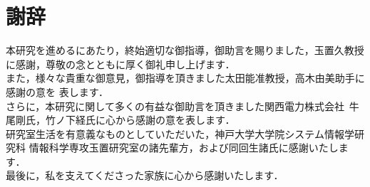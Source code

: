 \chapter*{謝辞}

本研究を進めるにあたり，終始適切な御指導，御助言を賜りました，玉置久教授に感謝，尊敬の念とともに厚く御礼申し上げます．
\\
\indent
また，様々な貴重な御意見，御指導を頂きました太田能准教授，高木由美助手に感謝の意を
表します．
\\
\indent
さらに，本研究に関して多くの有益な御助言を頂きました関西電力株式会社\,
牛尾剛氏，竹ノ下経氏に心から感謝の意を表します．
\\
\indent
研究室生活を有意義なものとしていただいた，神戸大学大学院システム情報学研究科
情報科学専攻玉置研究室の諸先輩方，および同回生諸氏に感謝いたします．
\\
\indent
最後に，私を支えてくださった家族に心から感謝いたします．
\newpage